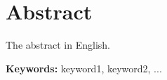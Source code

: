 \chapter*{Abstract}

The abstract in English. \lipsum[3]

\vspace{.5cm}

\textbf{Keywords:} keyword1, keyword2, ...
